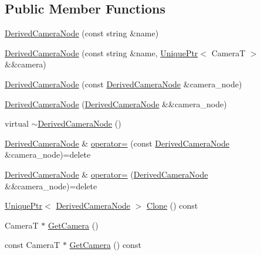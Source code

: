 \subsection*{Public Member Functions}
\begin{DoxyCompactItemize}
\item 
\hyperlink{classmage_1_1_derived_camera_node_af1886e653207481bdde0864b23ba8ca4}{Derived\+Camera\+Node} (const string \&name)
\item 
\hyperlink{classmage_1_1_derived_camera_node_a629ba0e2c1e6b29e6d45996256c59dbe}{Derived\+Camera\+Node} (const string \&name, \hyperlink{namespacemage_a8c307fbcc33bce9b7f2aa4c26c3b95cf}{Unique\+Ptr}$<$ CameraT $>$ \&\&camera)
\item 
\hyperlink{classmage_1_1_derived_camera_node_ae97b2a006e9e465e2530fdb814e855da}{Derived\+Camera\+Node} (const \hyperlink{classmage_1_1_derived_camera_node}{Derived\+Camera\+Node} \&camera\+\_\+node)
\item 
\hyperlink{classmage_1_1_derived_camera_node_a4c53aa526ee4f81a8d9cf8439650d291}{Derived\+Camera\+Node} (\hyperlink{classmage_1_1_derived_camera_node}{Derived\+Camera\+Node} \&\&camera\+\_\+node)
\item 
virtual \hyperlink{classmage_1_1_derived_camera_node_a74ab678b593c43b6bf95bb7fbfbd4d2d}{$\sim$\+Derived\+Camera\+Node} ()
\item 
\hyperlink{classmage_1_1_derived_camera_node}{Derived\+Camera\+Node} \& \hyperlink{classmage_1_1_derived_camera_node_a827c7952e061c6e12e38fff12585b3b3}{operator=} (const \hyperlink{classmage_1_1_derived_camera_node}{Derived\+Camera\+Node} \&camera\+\_\+node)=delete
\item 
\hyperlink{classmage_1_1_derived_camera_node}{Derived\+Camera\+Node} \& \hyperlink{classmage_1_1_derived_camera_node_a5faeff6f71a85b46d18f5b55e8dcf756}{operator=} (\hyperlink{classmage_1_1_derived_camera_node}{Derived\+Camera\+Node} \&\&camera\+\_\+node)=delete
\item 
\hyperlink{namespacemage_a8c307fbcc33bce9b7f2aa4c26c3b95cf}{Unique\+Ptr}$<$ \hyperlink{classmage_1_1_derived_camera_node}{Derived\+Camera\+Node} $>$ \hyperlink{classmage_1_1_derived_camera_node_a29e597fe2c9e0f37eeab8fec5330d764}{Clone} () const
\item 
CameraT $\ast$ \hyperlink{classmage_1_1_derived_camera_node_a1deeed527532c35d763c415b7c6eb6b1}{Get\+Camera} ()
\item 
const CameraT $\ast$ \hyperlink{classmage_1_1_derived_camera_node_a645e4b4775ae62190cdbdbdfabf9616f}{Get\+Camera} () const
\end{DoxyCompactItemize}
